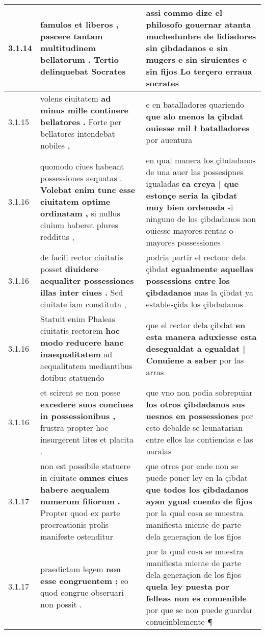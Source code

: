 \begin{tabular}{|p{1cm}|p{6.5cm}|p{6.5cm}|}
3.1.14 & famulos et liberos , \textbf{ pascere tantam multitudinem bellatorum . } Tertio delinquebat Socrates & assi commo dize el philosofo gouernar atanta muchedunbre de lidiadores \textbf{ sin çibdadanos e sin mugers e sin siruientes e sin fijos } Lo terçero erraua socrates \\\hline
3.1.15 & volens ciuitatem \textbf{ ad minus mille continere bellatores . } Forte per bellatores intendebat nobiles , & e en batalladores quariendo \textbf{ que alo menos la çibdat ouiesse mil ł batalladores } por auentura \\\hline
3.1.16 & quomodo ciues habeant possessiones aequatas . \textbf{ Volebat enim tunc esse ciuitatem optime ordinatam , } si nullus ciuium haberet plures redditus , & en qual manera los çibdadanos de una auer las possesipnes igualadas \textbf{ ca creya | que estonçe seria la çibdat muy bien ordenada } si ninguno de los çibdadanos non ouiesse mayores rentas o mayores possessiones \\\hline
3.1.16 & de facili rector ciuitatis posset \textbf{ diuidere aequaliter possessiones illas inter ciues . } Sed ciuitate iam constituta , & podria partir el rectoor dela çibdat \textbf{ egualmente aquellas possessions entre los çibdadanos } mas la çibdat ya establesçida los çibdadanos \\\hline
3.1.16 & Statuit enim Phaleas ciuitatis rectorem \textbf{ hoc modo reducere hanc inaequalitatem } ad aequalitatem mediantibus dotibus statuendo & que el rector dela çibdat \textbf{ en esta manera aduxiesse esta desegualdat a egualdat | Conuiene a saber } por las arras \\\hline
3.1.16 & et scirent se non posse \textbf{ excedere suos conciues in possessionibus , } frustra propter hoc insurgerent lites et placita . & que vno non podia sobrepuiar \textbf{ los otros çibdadanos sus uesnos en possessiones } por esto debalde se leunatarian entre ellos las contiendas e las uaraias \\\hline
3.1.17 & non est possibile statuere in ciuitate \textbf{ omnes ciues habere aequalem numerum filiorum . } Propter quod ex parte procreationis prolis manifeste ostenditur & que otros por ende non se puede poner ley en la çibdat \textbf{ que todos los çibdadanos ayan ygual cuento de fijos } por la qual cosa se muestra manifiesta miente de parte dela generaçion de los fijos \\\hline
3.1.17 & praedictam legem \textbf{ non esse congruentem ; } eo quod congrue obseruari non possit . & por la qual cosa se muestra manifiesta miente de parte dela generaçion de los fijos \textbf{ quela ley puesta por felleas non es conuenible } por que se non puede guardar conueinblemente ¶ \\\hline

\end{tabular}
